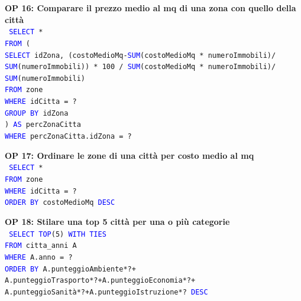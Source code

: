 \documentclass[a4paper,12pt]{report}
\begin{document}
            \noindent
            \textbf{OP 16: Comparare il prezzo medio al mq di una zona con quello della città} \\
            \texttt{
                \textcolor{blue}{SELECT} * \\
                \textcolor{blue}{FROM} (  \\
                \null\qquad\textcolor{blue}{SELECT} idZona, (costoMedioMq-\textcolor{blue}{SUM}(costoMedioMq * numeroImmobili)/ \\
                \null\qquad\textcolor{blue}{SUM}(numeroImmobili)) * 100 / \textcolor{blue}{SUM}(costoMedioMq * numeroImmobili)/ \\
                \null\qquad\textcolor{blue}{SUM}(numeroImmobili) \\
                \null\qquad\textcolor{blue}{FROM} zone \\
                \null\qquad\textcolor{blue}{WHERE} idCitta = ? \\
                \null\qquad\textcolor{blue}{GROUP BY} idZona\\
                ) \textcolor{blue}{AS} percZonaCitta\\
                \textcolor{blue}{WHERE} percZonaCitta.idZona = ? \\
            }

            \noindent
            \textbf{OP 17: Ordinare le zone di una città per costo medio al mq} \\
            \texttt{
                \textcolor{blue}{SELECT} * \\
                \textcolor{blue}{FROM} zone \\
                \textcolor{blue}{WHERE} idCitta = ? \\
                \textcolor{blue}{ORDER BY} costoMedioMq \textcolor{blue}{DESC} \\
            }

            \noindent
            \textbf{OP 18: Stilare una top 5 città per una o più categorie} \\
            \texttt{
                \textcolor{blue}{SELECT TOP}(5) \textcolor{blue}{WITH TIES} \\
                \textcolor{blue}{FROM} citta\_anni A\\
                \textcolor{blue}{WHERE} A.anno = ? \\
                \textcolor{blue}{ORDER BY} A.punteggioAmbiente*?+ \\
                A.punteggioTrasporto*?+A.punteggioEconomia*?+ \\
                A.punteggioSanità*?+A.punteggioIstruzione*? \textcolor{blue}{DESC} \\
            }
            
\end{document}
